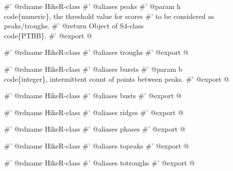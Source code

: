 \documentclass[a4paper]{article}
\begin{document}
\nwenddocs{}\endmoddef
#' @rdname HikeR-class
#' @aliases peaks
#' @param h \\code\{numeric\}, the threshold value for scores
#' to be considered as peaks/troughs.
#' @return Object of S4-class \\code\{PTBB\}.
#' @export
\nwendcode{}@

\nwenddocs{}\endmoddef
#' @rdname HikeR-class
#' @aliases troughs
#' @export
\nwendcode{}@

\nwenddocs{}\endmoddef
#' @rdname HikeR-class
#' @aliases bursts
#' @param b \\code\{integer\}, intermittent count of points between peaks.
#' @export
\nwendcode{}@

\nwenddocs{}\endmoddef
#' @rdname HikeR-class
#' @aliases busts
#' @export
\nwendcode{}@

\nwenddocs{}\endmoddef
#' @rdname HikeR-class
#' @aliases ridges
#' @export
\nwendcode{}@

\nwenddocs{}\endmoddef
#' @rdname HikeR-class
#' @aliases phases
#' @export
\nwendcode{}@

\nwenddocs{}\endmoddef
#' @rdname HikeR-class
#' @aliases topeaks
#' @export
\nwendcode{}@

\nwenddocs{}\endmoddef
#' @rdname HikeR-class
#' @aliases totroughs
#' @export
\nwendcode{}@
\end{document}
